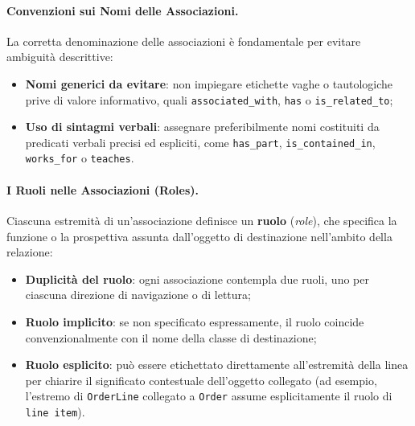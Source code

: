 \documentclass[12pt]{extarticle}
\begin{document}
\paragraph{Convenzioni sui Nomi delle Associazioni.}
La corretta denominazione delle associazioni è fondamentale per evitare ambiguità descrittive:
\begin{itemize}
    \item \textbf{Nomi generici da evitare}: non impiegare etichette vaghe o tautologiche prive di valore informativo, quali \texttt{associated\_with}, \texttt{has} o \texttt{is\_related\_to};
    \item \textbf{Uso di sintagmi verbali}: assegnare preferibilmente nomi costituiti da predicati verbali precisi ed espliciti, come \texttt{has\_part}, \texttt{is\_contained\_in}, \texttt{works\_for} o \texttt{teaches}.
\end{itemize}

\paragraph{I Ruoli nelle Associazioni (Roles).}
Ciascuna estremità di un'associazione definisce un \textbf{ruolo} (\textit{role}), che specifica la funzione o la prospettiva assunta dall'oggetto di destinazione nell'ambito della relazione:
\begin{itemize}
    \item \textbf{Duplicità del ruolo}: ogni associazione contempla due ruoli, uno per ciascuna direzione di navigazione o di lettura;
    \item \textbf{Ruolo implicito}: se non specificato espressamente, il ruolo coincide convenzionalmente con il nome della classe di destinazione;
    \item \textbf{Ruolo esplicito}: può essere etichettato direttamente all'estremità della linea per chiarire il significato contestuale dell'oggetto collegato (ad esempio, l'estremo di \texttt{OrderLine} collegato a \texttt{Order} assume esplicitamente il ruolo di \texttt{line item}).
\end{itemize}
\end{document}
